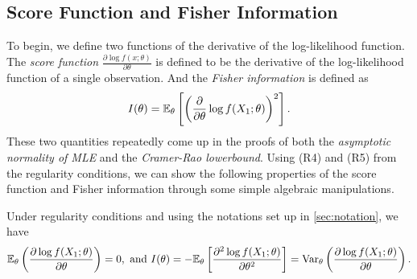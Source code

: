 \subsection{Score Function and Fisher Information}
To begin, we define two functions of the derivative of the log-likelihood function. The \emph{score function} $\frac{\partial\log f(x;\theta)}{\partial\theta}$ is defined to be the derivative of the log-likelihood function of a single observation. And the \emph{Fisher information} is defined as
\begin{align}
I(\theta) = \mathbb{E}_{\theta}\left[ \left( \frac{\partial}{\partial\theta}\log f(X_1;\theta) \right)^2 \right]. \label{eqn:fisher}
\end{align}
These two quantities repeatedly come up in the proofs of both the \emph{asymptotic normality of MLE} and the \emph{Cramer-Rao lowerbound}. Using (R4) and (R5) from the regularity conditions, we can show the following properties of the score function and Fisher information through some simple algebraic manipulations.
\begin{lemma} \label{lem:2}
Under regularity conditions and using the notations set up in \cref{sec:notation}, we have
\begin{align*}
\mathbb{E}_\theta\left( \frac{\partial\log f(X_1;\theta)}{\partial \theta} \right) = 0, \text{ and }
I(\theta) = -\mathbb{E}_\theta\left[ \frac{\partial^2\log f(X_1;\theta)}{\partial \theta^2} \right] = \text{Var}_\theta\left( \frac{\partial\log f(X_1;\theta)}{\partial \theta} \right).
\end{align*}
\end{lemma}

